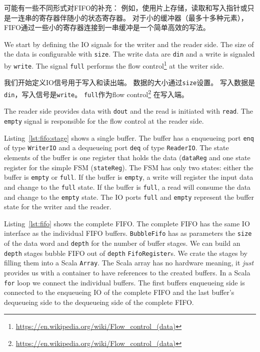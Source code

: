 \documentclass[%
    10pt,
    headinclude, footexclude,
    openright, %
    notitlepage,
    cleardoubleempty,
    headsepline,
    pointlessnumbers,
    bibtotoc, idxtotoc,
    ]{scrbook}
\newcommand{\code}[1]{{\small{\texttt{#1}}}}
\newcommand{\myref}[2]{\href{#1}{#2}}
\renewcommand{\myref}[2]{{#2}{\footnote{\url{#1}}}}
\begin{document}
{可能有一些不同形式对FIFO的补充：
例如，使用片上存储，读取和写入指针或只是一连串的寄存器伴随小的状态寄存器。
对于小的缓冲器（最多十多种元素）， FIFO通过一些小的寄存器连接到一串缓冲是一个简单高效的写法。

We start by defining the IO signals for the writer and the reader side.
The size of the data is configurable with \code{size}.
The write data are \code{din} and a write is signaled by \code{write}.
The signal \code{full} performs the
\myref{https://en.wikipedia.org/wiki/Flow_control_(data)}{flow control}
at the writer side.

我们开始定义IO信号用于写入和读出端。
数据的大小通过\code{size}设置。
写入数据是\code{din}，写入信号是\code{write}。
\code{full}作为\myref{https://en.wikipedia.org/wiki/Flow_control_(data)}{flow control}
在写入端。


The reader side provides data with \code{dout} and the read is initiated
with \code{read}. The \code{empty} signal is responsible for the flow control
at the reader side.


Listing~\ref{lst:fifo:stage} shows a single buffer. The buffer has a enqueueing port
\code{enq} of type \code{WriterIO} and a dequeueing port \code{deq} of type
\code{ReaderIO}. The state elements of the buffer is one register that holds the
data (\code{dataReg} and one state register for the simple FSM (\code{stateReg}).
The FSM has only two states: either the buffer is \code{empty} or \code{full}.
If the buffer is \code{empty}, a write will register the input data and change
to the \code{full} state.
If the buffer is \code{full}, a read will consume the data and change to the
\code{empty} state.
The IO ports \code{full} and \code{empty} represent the buffer state for
the writer and the reader.


Listing~\ref{lst:fifo} shows the complete FIFO. The complete FIFO has
the same IO interface as the individual FIFO buffers.
\code{BubbleFifo} has as parameters the \code{size} of the data
word and \code{depth} for the number of buffer stages.
We can build an \code{depth} stages bubble FIFO out of \code{depth}
\code{FifoRegister}s. We crate the stages by filling them into a Scala \code{Array}.
The Scala array has no hardware meaning, it \emph{just} provides us with
a container to have references to the created buffers.
In a Scala \code{for} loop we connect the individual buffers.
The first buffers enqueueing side is connected to the enqueueing IO of
the complete FIFO and the last buffer's dequeueing side to the
dequeueing side of the complete FIFO.

}
\end{document}
